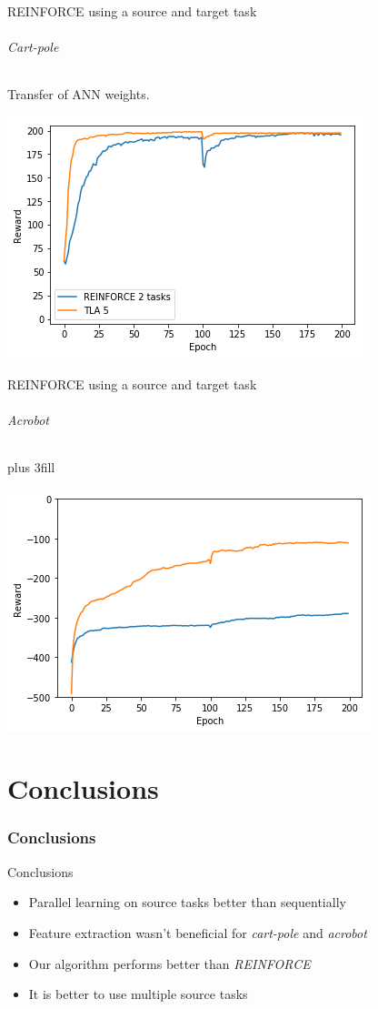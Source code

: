 \begin{frame}[fragile]{REINFORCE using a source and target task}
\framesubtitle{Cart-pole}
Transfer of ANN weights.
\begin{center}
    \includegraphics[width=.8\linewidth]{results/CartPole/reinforce_2tasks.png}
\end{center}
\end{frame}

\begin{frame}[fragile]{REINFORCE using a source and target task}
\framesubtitle{Acrobot}
\vskip0pt plus 3fill
\begin{center}
    \includegraphics[width=.8\linewidth]{results/Acrobot/reinforce_2tasks.png}
\end{center}
\end{frame}

\part{Conclusions}
\section{Conclusions}
\begin{frame}[fragile]{Conclusions}
\begin{itemize}
    \item Parallel learning on source tasks better than sequentially
    \item Feature extraction wasn't beneficial for \textit{cart-pole} and \textit{acrobot}
    \item Our algorithm performs better than \textit{REINFORCE}
    \item It is better to use multiple source tasks
\end{itemize}
\end{frame}


